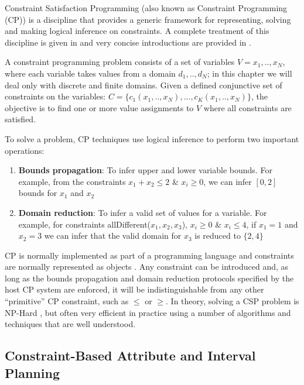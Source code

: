 Constraint Satisfaction Programming (also known as Constraint
Programming (CP)) is a discipline that provides a generic framework
for representing, solving and making logical inference on
constraints. A complete treatment of this discipline is given in
\cite{marriott98,apt03} and very concise introductions are provided in
\cite{bartak99,lustig01}.

A constraint programming problem consists of a set of variables $V=
{x_1,..,x_N}$, where each variable takes values from a domain
$d_1,..,d_N$; in this chapter we will deal only with discrete and
finite domains. Given a defined conjunctive set of constraints on the
variables: $C=\{c_1(x_1,..,x_N), ..., c_K(x_1,..,x_N)\}$, the objective
is to find one or more value assignments to $V$ where all constraints
are satisfied.

To solve a problem, CP techniques use logical inference to perform two
important operations:

\begin{enumerate}

\item \textbf{Bounds propagation}: To infer upper and lower variable
  bounds. For example, from the constraints $x_1 + x_2 \leq 2$ \&
  $x_i \geq 0$, we can infer $[0,2]$ bounds for $x_1$ and $x_2$

\item \textbf{Domain reduction}: To infer a valid set of values for a variable.
  For example, for  constraints allDifferent($x_1,x_2,x_3$), $x_i \geq
  0$ \& $x_i \leq 4$, if $x_1 = 1$ and $x_2 = 3$ we can infer that the
  valid domain for $x_3$ is reduced  to $\{2,4\}$

\end{enumerate}

CP is normally implemented as part of a programming language and
constraints are normally represented as objects \cite{puget95}
. Any constraint can be introduced and, as long as the
bounds propagation and domain reduction protocols specified by the host
CP system are enforced, it will be indistinguishable from any other
``primitive'' CP constraint, such as $\leq$ or $\geq$. In theory,
solving a CSP problem is NP-Hard \cite{ghallab04}, but often very
efficient in practice using a number of algorithms and techniques that
are well understood.


\subsection{Constraint-Based Attribute and Interval Planning}
\label{sec:europa:cp}

